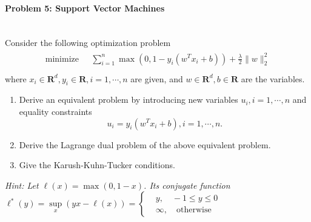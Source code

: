 \documentclass[a4paper]{ctexart}
\begin{document}
\paragraph{Problem 5: Support Vector Machines}
~\\
Consider the following optimization problem
\begin{gather*}
    \begin{matrix}
        \text{minimize~~} & \sum_{i=1}^n\max\left(0,1-y_i(w^Tx_i+b)\right)+\frac{\lambda}{2}\|w\|_2^2 \\
    \end{matrix}
\end{gather*}
where $x_i\in\mathbf{R}^{d},y_i\in \mathbf{R},i=1,\cdots,n$ are given, and $w\in \mathbf{R}^d,b\in\mathbf{R}$ are the variables.
\begin{enumerate}[(1)]
    \item Derive an equivalent problem by introducing new variables $u_i,i=1,\cdots,n$ and equality constraints \[u_i=y_i(w^Tx_i+b),i=1,\cdots,n.\]
    \item Derive the Lagrange dual problem of the above equivalent problem.
    \item Give the Karush-Kuhn-Tucker conditions.
\end{enumerate}

\noindent\emph{Hint: Let $\ell(x)=\max(0,1-x)$. Its conjugate function $\ell^\ast(y)=\sup\limits_{x}(yx-\ell(x))=\left\{
\begin{aligned}
     & y, \quad-1\leq y\leq0        \\
     & \infty,\quad\text{otherwise}
\end{aligned}
\right.$}
\end{document}
